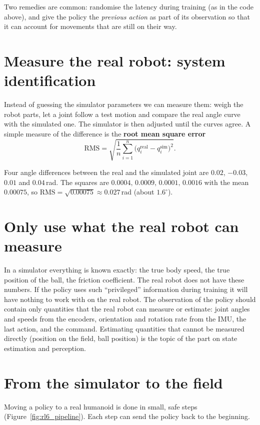 Two remedies are common: randomise the latency during training (as in the code above), and give the policy the \emph{previous action} as part of its observation so that it can account for movements that are still on their way.

\section*{Measure the real robot: system identification}
Instead of guessing the simulator parameters we can measure them: weigh the robot parts, let a joint follow a test motion and compare the real angle curve with the simulated one. The simulator is then adjusted until the curves agree. A simple measure of the difference is the \textbf{root mean square error}
\[
\text{RMS}=\sqrt{\frac1n\sum_{i=1}^{n}\bigl(q_i^{\text{real}}-q_i^{\text{sim}}\bigr)^2}.
\]

\begin{example}
Four angle differences between the real and the simulated joint are $0.02$, $-0.03$, $0.01$ and $0.04$\,rad. The squares are $0.0004,\,0.0009,\,0.0001,\,0.0016$ with the mean $0.00075$, so $\text{RMS}=\sqrt{0.00075}\approx0.027$\,rad (about $1.6^\circ$).
\end{example}

\section*{Only use what the real robot can measure}
In a simulator everything is known exactly: the true body speed, the true position of the ball, the friction coefficient. The real robot does not have these numbers. If the policy uses such ``privileged'' information during training it will have nothing to work with on the real robot. The observation of the policy should contain only quantities that the real robot can measure or estimate: joint angles and speeds from the encoders, orientation and rotation rate from the IMU, the last action, and the command. Estimating quantities that cannot be measured directly (position on the field, ball position) is the topic of the part on state estimation and perception.

\section*{From the simulator to the field}
Moving a policy to a real humanoid is done in small, safe steps (Figure~\ref{fig:rl6_pipeline}). Each step can send the policy back to the beginning.

